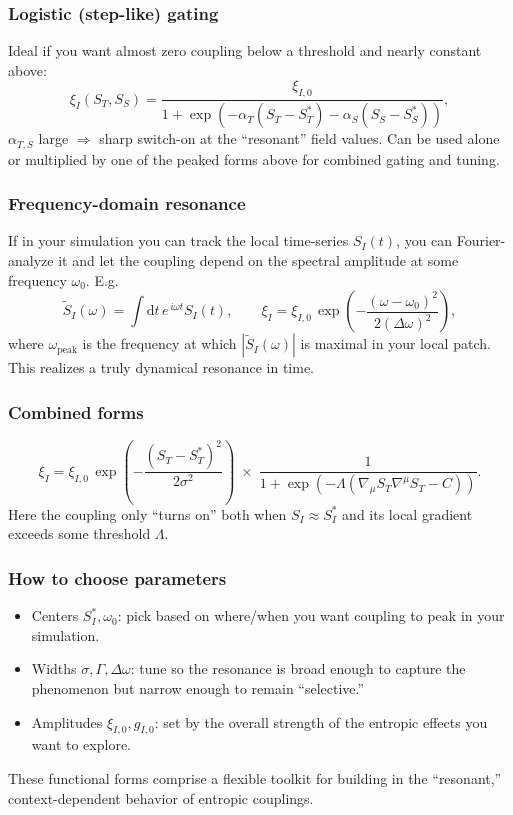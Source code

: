 \documentclass[11pt,a4paper]{article}
\newcommand{\ST}{S_T}
\newcommand{\SSp}{S_S}
\newcommand{\Adtm}{\mathrm{d}t}
\begin{document}
\subsubsection{Logistic (step-like) gating}
Ideal if you want almost zero coupling below a threshold and nearly constant above:
\begin{equation*}
\xi_{I}(\ST,\SSp) =\frac{\xi_{I,0}} {1+\exp{\left(-\alpha_T(\ST-\ST^*) -\alpha_S(\SSp-\SSp^*)\right)}},
\end{equation*}
$\alpha_{T,S}$ large $\Rightarrow$ sharp switch-on at the ``resonant'' field values.
Can be used alone or multiplied by one of the peaked forms above for combined gating and tuning.

\subsubsection{Frequency-domain resonance}
If in your simulation you can track the local time-series $S_I(t)$, you can Fourier-analyze it and let the coupling depend on the spectral amplitude at some frequency $\omega_0$. E.g.
\begin{equation*}
\widetilde S_I(\omega) =\int \Adtm\,e^{\,i\omega t}S_I(t),\qquad \xi_I =\xi_{I,0}\, \exp\!{\left(-\frac{(\omega-\omega_0)^2}{2(\Delta\omega)^2}\right)},
\end{equation*}
where $\omega_{\text{peak}}$ is the frequency at which $|\widetilde S_I(\omega)|$ is maximal in your local patch. This realizes a truly dynamical resonance in time.

\subsubsection{Combined forms}
\begin{equation*}
\xi_I =\xi_{I,0}\, \exp\!{\left(-\frac{(\ST-\ST^*)^2}{2\sigma^2}\right)}\; \times\; \frac{1}{1+\exp{\left(-\Lambda(\nabla_\mu\ST\nabla^\mu\ST-C)\right)}}.
\end{equation*}
Here the coupling only ``turns on'' both when $S_I\approx S_I^*$ and its local gradient exceeds some threshold $\Lambda$.

\subsubsection{How to choose parameters}
\begin{itemize}
    \item Centers $S_I^*, \omega_0$: pick based on where/when you want coupling to peak in your simulation.
    \item Widths $\sigma,\Gamma,\Delta\omega$: tune so the resonance is broad enough to capture the phenomenon but narrow enough to remain ``selective.''
    \item Amplitudes $\xi_{I,0},g_{I,0}$: set by the overall strength of the entropic effects you want to explore.
\end{itemize}
These functional forms comprise a flexible toolkit for building in the ``resonant,'' context-dependent behavior of entropic couplings.
\end{document}
